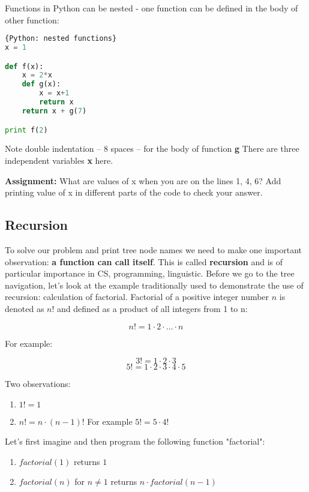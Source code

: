 Functions in Python can be nested - one function can be defined in
the body of other function:

\begin{lstlisting}[style=codelst,language=Python]{Python: nested functions}
x = 1

def f(x):
    x = 2*x
    def g(x):
        x = x+1
        return x
    return x + g(7)

print f(2)
\end{lstlisting}
Note double indentation -- 8 spaces -- for the body of function \textbf{g}
There are three independent variables \textbf{x} here.

\bigskip
\begin{tcolorbox}
\textbf{Assignment:}
What are values of x when you are on the lines 1, 4, 6?
Add printing value of x in different parts of the code
to check your answer.
\end{tcolorbox}

\subsection{Recursion}

To solve our problem and print tree node names we need
to make one important observation: \textbf{a function can call itself}.
This is called \textbf{recursion} and is of particular importance in
CS, programming, linguistic. Before we go to the tree navigation,
let's look at the example traditionally used to demonstrate
the use of recursion: calculation of factorial. Factorial of a
positive integer number $n$
is denoted as $n!$ and defined as a product of all integers
from 1 to n:

$$n! = 1 \cdot 2 \cdot\dots\cdot n$$

For example:

$$3! = 1\cdot 2\cdot 3$$
$$5! = 1\cdot 2\cdot 3\cdot 4\cdot 5$$

Two observations:

\begin{leftborder}
\begin{enumerate}
\item $1! = 1$
\item $n! = n\cdot (n-1)!$ For example $5! = 5\cdot 4!$
\end{enumerate}
\end{leftborder}

Let's first imagine and then program the following function "factorial":

\begin{leftborder}
\begin{enumerate}
\item $factorial(1)$ returns $1$
\item $factorial(n)$ for $n\neq 1$ returns $n\cdot factorial(n-1)$
\end{enumerate}
\end{leftborder}

